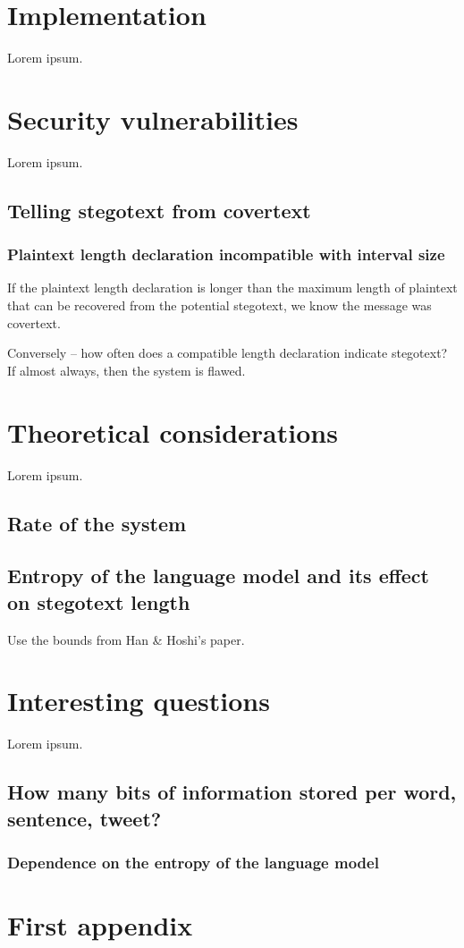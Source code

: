 \documentclass{IIBproject}
\begin{document}
\newpage
\section{Implementation}

Lorem ipsum.

\newpage
\section{Security vulnerabilities}

Lorem ipsum.

\subsection{Telling stegotext from covertext}

\subsubsection{Plaintext length declaration incompatible with interval size}

If the plaintext length declaration is longer than the maximum length of plaintext that can be recovered from the potential stegotext, we know the message was covertext.

Conversely -- how often does a compatible length declaration indicate stegotext? If almost always, then the system is flawed.

\newpage
\section{Theoretical considerations}

Lorem ipsum.

\subsection{Rate of the system}

\subsection{Entropy of the language model and its effect on stegotext length}

Use the bounds from Han \& Hoshi's paper.

\newpage
\section{Interesting questions}

Lorem ipsum.

\subsection{How many bits of information stored per word, sentence, tweet?}

\subsubsection{Dependence on the entropy of the language model}

\newpage
\footnotesize



\newpage
\appendix

\section{First appendix}
\end{document}
